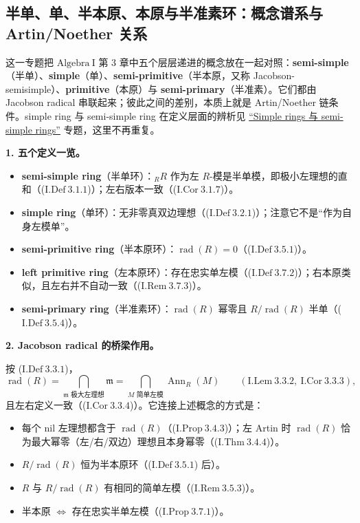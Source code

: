 \documentclass[a4paper]{ctexart}
\theoremstyle{definition}
\theoremstyle{analysis}
\theoremstyle{plain}
\begin{document}
\subsection{\texorpdfstring{半单、单、半本原、本原与半准素环：概念谱系与 Artin/Noether 关系}{半单、单、半本原、本原与半准素环}}\label{subsec:topic-simple-primitive-spectrum}

这一专题把 \(\mathrm{Algebra\ I}\) 第 \(3\) 章中五个层层递进的概念放在一起对照：\textbf{semi-simple}（半单）、\textbf{simple}（单）、\textbf{semi-primitive}（半本原，又称 Jacobson-semisimple）、\textbf{primitive}（本原）与 \textbf{semi-primary}（半准素）。它们都由 Jacobson radical 串联起来；彼此之间的差别，本质上就是 Artin/Noether 链条件。simple ring 与 semi-simple ring 在定义层面的辨析见 \hyperref[subsec:topic-simple-semisimple-rings]{“Simple rings 与 semi-simple rings”} 专题，这里不再重复。

\medskip

\textbf{1. 五个定义一览。}

\begin{itemize}
  \item \textbf{semi-simple ring}（半单环）：\({}_RR\) 作为左 \(R\)-模是半单模，即极小左理想的直和（(\(\mathrm{I.Def}\ 3.1.1\))）；左右版本一致（(\(\mathrm{I.Cor}\ 3.1.7\))）。
  \item \textbf{simple ring}（单环）：无非零真双边理想（(\(\mathrm{I.Def}\ 3.2.1\))）；注意它不是“作为自身左模单”。
  \item \textbf{semi-primitive ring}（半本原环）：\(\operatorname{rad}(R)=0\)（(\(\mathrm{I.Def}\ 3.5.1\))）。
  \item \textbf{left primitive ring}（左本原环）：存在忠实单左模（(\(\mathrm{I.Def}\ 3.7.2\))）；右本原类似，且左右并不自动一致（(\(\mathrm{I.Rem}\ 3.7.3\))）。
  \item \textbf{semi-primary ring}（半准素环）：\(\operatorname{rad}(R)\) 幂零且 \(R/\operatorname{rad}(R)\) 半单（(\(\mathrm{I.Def}\ 3.5.4\))）。
\end{itemize}

\medskip

\textbf{2. Jacobson radical 的桥梁作用。}

按 (\(\mathrm{I.Def}\ 3.3.1\))，
\[
  \operatorname{rad}(R)=\bigcap_{\mathfrak m\text{ 极大左理想}}\mathfrak m
  =\bigcap_{M\text{ 简单左模}}\operatorname{Ann}_R(M)
  \qquad (\mathrm{I.Lem}\ 3.3.2,\ \mathrm{I.Cor}\ 3.3.3),
\]
且左右定义一致（(\(\mathrm{I.Cor}\ 3.3.4\))）。它连接上述概念的方式是：

\begin{itemize}
  \item 每个 nil 左理想都含于 \(\operatorname{rad}(R)\)（(\(\mathrm{I.Prop}\ 3.4.3\))）；左 Artin 时 \(\operatorname{rad}(R)\) 恰为最大幂零（左/右/双边）理想且本身幂零（(\(\mathrm{I.Thm}\ 3.4.4\))）。
  \item \(R/\operatorname{rad}(R)\) 恒为半本原环（(\(\mathrm{I.Def}\ 3.5.1\)) 后）。
  \item \(R\) 与 \(R/\operatorname{rad}(R)\) 有相同的简单左模（(\(\mathrm{I.Rem}\ 3.5.3\))）。
  \item 半本原 \(\iff\) 存在忠实半单左模（(\(\mathrm{I.Prop}\ 3.7.1\))）。
\end{itemize}
\end{document}
